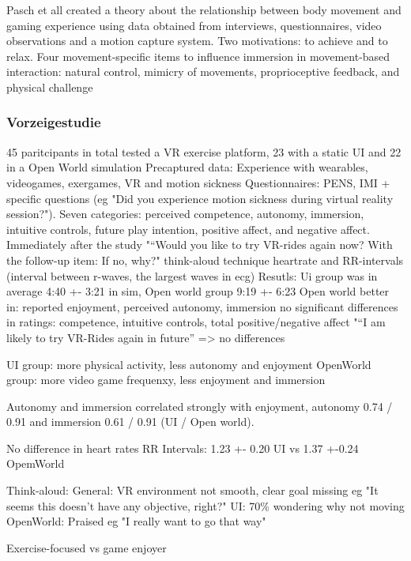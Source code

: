Pasch et all \cite{pasch2009movement} created a theory about the relationship
between body movement and gaming experience using data obtained from interviews, questionnaires, video observations and a motion capture system. 
Two motivations: to achieve and to relax.
Four movement-specific items  to influence immersion in movement-based interaction: natural control, mimicry of movements, proprioceptive feedback, and physical challenge


\subsubsection{Vorzeigestudie}
\cite{ijaz2020player}
45 paritcipants in total tested a VR exercise platform, 23 with a static UI and 22 in a Open World simulation
Precaptured data: Experience with wearables, videogames, exergames, VR and motion sickness
Questionnaires: PENS, IMI + specific questions (eg "Did you experience motion sickness during virtual reality session?"). Seven categories: perceived competence, autonomy, immersion, intuitive controls, future play intention, positive affect, and negative affect.
Immediately after the study "“Would you like to try VR-rides again now? With the follow-up item: If no, why?"
think-aloud technique
heartrate and RR-intervals (interval between r-waves, the largest waves in ecg)
Resutls: Ui group was in average 4:40 +- 3:21 in sim, Open world group 9:19 +- 6:23
Open world better in: reported enjoyment, perceived autonomy, immersion
no significant differences in ratings: competence, intuitive controls, total positive/negative affect
"“I am likely to try VR-Rides again in future” => no differences

UI group: more  physical activity, less autonomy and enjoyment
OpenWorld group: more video game frequenxy, less enjoyment and immersion

Autonomy and immersion correlated strongly with enjoyment, autonomy 0.74 / 0.91 and immersion 0.61 / 0.91 (UI / Open world).

No difference in heart rates
RR Intervals: 1.23 +- 0.20 UI vs 1.37 +-0.24 OpemWorld

Think-aloud:
General: VR environment not smooth, clear goal missing eg "It seems this doesn’t have any objective, right?"
UI: 70\% wondering why not moving
OpenWorld: Praised eg "I really want to go that way"

Exercise-focused vs game enjoyer



